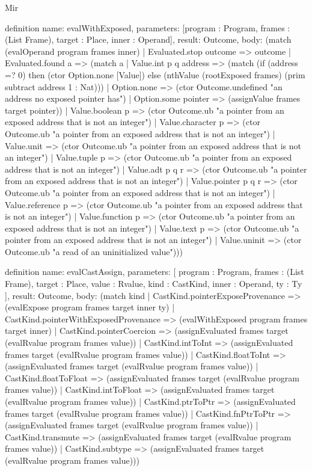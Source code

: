 \begin{lexlean}{Mir}
\begin{semanticmodule}
definition{
  name: evalWithExposed,
  parameters: [program : Program, frames : (List Frame), target : Place, inner : Operand],
  result: Outcome,
  body: (match (evalOperand program frames inner)
    | Evaluated.stop outcome => outcome
    | Evaluated.found a => (match a
      | Value.int p q address => (match (if (address =? 0) then (ctor Option.none [Value]) else (nthValue (rootExposed frames) (prim subtract address 1 : Nat)))
        | Option.none => (ctor Outcome.undefined "an address no exposed pointer has")
        | Option.some pointer => (assignValue frames target pointer))
      | Value.boolean p => (ctor Outcome.ub "a pointer from an exposed address that is not an integer")
      | Value.character p => (ctor Outcome.ub "a pointer from an exposed address that is not an integer")
      | Value.unit => (ctor Outcome.ub "a pointer from an exposed address that is not an integer")
      | Value.tuple p => (ctor Outcome.ub "a pointer from an exposed address that is not an integer")
      | Value.adt p q r => (ctor Outcome.ub "a pointer from an exposed address that is not an integer")
      | Value.pointer p q r => (ctor Outcome.ub "a pointer from an exposed address that is not an integer")
      | Value.reference p => (ctor Outcome.ub "a pointer from an exposed address that is not an integer")
      | Value.function p => (ctor Outcome.ub "a pointer from an exposed address that is not an integer")
      | Value.text p => (ctor Outcome.ub "a pointer from an exposed address that is not an integer")
      | Value.uninit => (ctor Outcome.ub "a read of an uninitialized value")))
}

definition{
  name: evalCastAssign,
  parameters: [
    program : Program,
    frames : (List Frame),
    target : Place,
    value : Rvalue,
    kind : CastKind,
    inner : Operand,
    ty : Ty
  ],
  result: Outcome,
  body: (match kind
    | CastKind.pointerExposeProvenance => (evalExpose program frames target inner ty)
    | CastKind.pointerWithExposedProvenance => (evalWithExposed program frames target inner)
    | CastKind.pointerCoercion => (assignEvaluated frames target (evalRvalue program frames value))
    | CastKind.intToInt => (assignEvaluated frames target (evalRvalue program frames value))
    | CastKind.floatToInt => (assignEvaluated frames target (evalRvalue program frames value))
    | CastKind.floatToFloat => (assignEvaluated frames target (evalRvalue program frames value))
    | CastKind.intToFloat => (assignEvaluated frames target (evalRvalue program frames value))
    | CastKind.ptrToPtr => (assignEvaluated frames target (evalRvalue program frames value))
    | CastKind.fnPtrToPtr => (assignEvaluated frames target (evalRvalue program frames value))
    | CastKind.transmute => (assignEvaluated frames target (evalRvalue program frames value))
    | CastKind.subtype => (assignEvaluated frames target (evalRvalue program frames value)))
}


\end{semanticmodule}
\end{lexlean}

